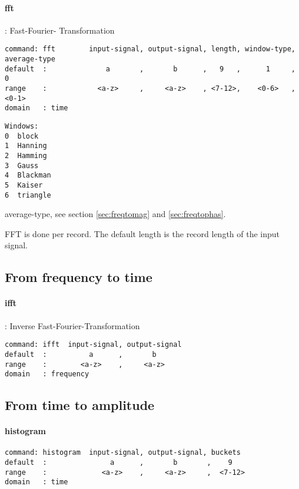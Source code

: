 \documentclass{report}
\newcommand{\bc}{\scriptsize}
\newcommand{\ec}{\normalsize}
\begin{document}
\paragraph{fft}: Fast-Fourier- Transformation

\bc
\begin{verbatim}
command: fft        input-signal, output-signal, length, window-type, average-type
default  :              a       ,       b      ,   9   ,      1     ,      0
range    :            <a-z>     ,     <a-z>    , <7-12>,    <0-6>   ,    <0-1>
domain   : time
\end{verbatim}
\ec

\begin{verbatim}
Windows:
0  block
1  Hanning
2  Hamming
3  Gauss
4  Blackman
5  Kaiser
6  triangle
\end{verbatim}

average-type, see section \ref{sec:freqtomag} and \ref{sec:freqtophas}.

FFT is done per record. The default length is the record length of the input signal.

\subsection{From frequency to time}

\paragraph{ifft}: Inverse Fast-Fourier-Transformation

\bc
\begin{verbatim}
command: ifft  input-signal, output-signal
default  :          a      ,       b
range    :        <a-z>    ,     <a-z>
domain   : frequency
\end{verbatim}
\ec

\subsection{From time to amplitude}

\paragraph{histogram}

\bc
\begin{verbatim}
command: histogram  input-signal, output-signal, buckets
default  :               a      ,       b       ,    9
range    :             <a-z>    ,     <a-z>     ,  <7-12>
domain   : time
\end{verbatim}
\ec
\end{document}
